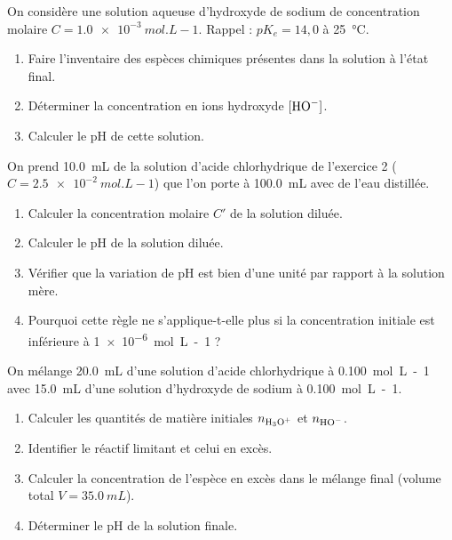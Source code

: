 \documentclass[11pt]{article}
\begin{document}
\begin{exercice}
On considère une solution aqueuse d'hydroxyde de sodium  de concentration molaire $C = \SI{1,0e-3}{mol.L-1}$.
Rappel : $pK_e = 14,0$ à \SI{25}{\celsius}.
\begin{enumerate}
    \item Faire l'inventaire des espèces chimiques présentes dans la solution à l'état final.
    \item Déterminer la concentration en ions hydroxyde $[\ce{HO-}]$.
    \item Calculer le pH de cette solution.
\end{enumerate}
\end{exercice}

\begin{exercice}
On prend \SI{10,0}{mL} de la solution d'acide chlorhydrique de l'exercice 2 ($C = \SI{2,5e-2}{mol.L-1}$) que l'on porte à \SI{100,0}{mL} avec de l'eau distillée.
\begin{enumerate}
    \item Calculer la concentration molaire $C'$ de la solution diluée.
    \item Calculer le pH de la solution diluée.
    \item Vérifier que la variation de pH est bien d'une unité par rapport à la solution mère.
    \item Pourquoi cette règle ne s'applique-t-elle plus si la concentration initiale est inférieure à \SI{1e-6}{mol.L-1} ?
\end{enumerate}
\end{exercice}

\begin{exercice}
On mélange \SI{20,0}{mL} d'une solution d'acide chlorhydrique  à \SI{0,100}{mol.L-1} avec \SI{15,0}{mL} d'une solution d'hydroxyde de sodium  à \SI{0,100}{mol.L-1}.
\begin{enumerate}
    \item Calculer les quantités de matière initiales $n_{\ce{H3O+}}$ et $n_{\ce{HO-}}$.
    \item Identifier le réactif limitant et celui en excès.
    \item Calculer la concentration de l'espèce en excès dans le mélange final (volume total $V = \SI{35,0}{mL}$).
    \item Déterminer le pH de la solution finale.
\end{enumerate}
\end{exercice}
\end{document}
